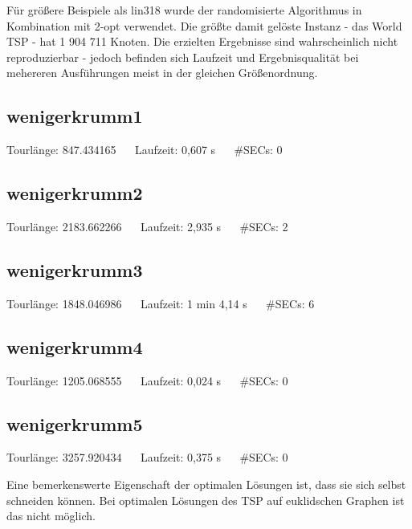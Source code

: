 \documentclass[a4paper, 10pt, ngerman]{article}
\begin{document}
Für größere Beispiele als lin318 wurde der randomisierte Algorithmus in Kombination mit 2-opt verwendet. Die größte damit gelöste Instanz - das World TSP - hat 1 904 711 Knoten. Die erzielten Ergebnisse sind wahrscheinlich nicht reproduzierbar - jedoch befinden sich Laufzeit und Ergebnisqualität bei mehereren Ausführungen meist in der gleichen Größenordnung.

\subsection{wenigerkrumm1}



\noindent Tourlänge: 847.434165 $\quad$ Laufzeit: 0,607 s $\quad$ \#SECs: 0

\subsection{wenigerkrumm2}



\noindent Tourlänge: 2183.662266 $\quad$ Laufzeit: 2,935 s $\quad$ \#SECs: 2

\subsection{wenigerkrumm3}



\noindent Tourlänge: 1848.046986 $\quad$ Laufzeit: 1 min 4,14 s $\quad$ \#SECs: 6

\subsection{wenigerkrumm4}



\noindent Tourlänge: 1205.068555 $\quad$ Laufzeit: 0,024 s $\quad$ \#SECs: 0

\subsection{wenigerkrumm5}



\noindent Tourlänge: 3257.920434 $\quad$ Laufzeit: 0,375 s $\quad$ \#SECs: 0
\medskip

\noindent Eine bemerkenswerte Eigenschaft der optimalen Lösungen ist, dass sie sich selbst schneiden können. Bei optimalen Lösungen des TSP auf euklidschen Graphen ist das nicht möglich. 
\end{document}
